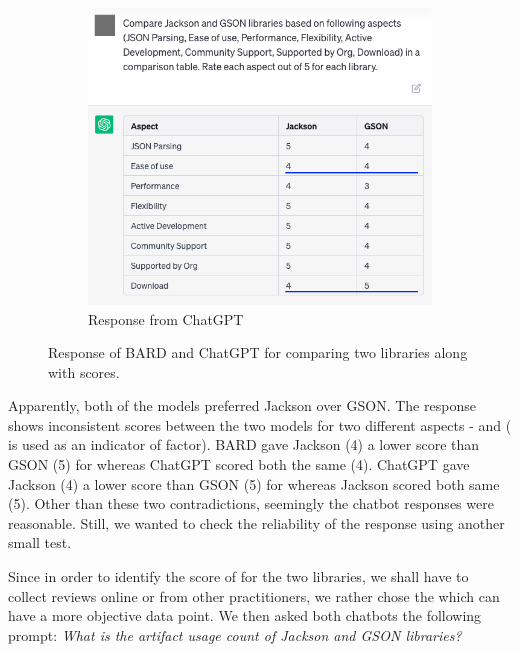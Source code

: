\begin{figure}
\begin{subfigure}{.48\textwidth}
    \label{fig:bard-table}
    \end{subfigure}
    \begin{subfigure}{.48\textwidth}
    \centering
        \includegraphics[scale=.4]{images/ChatGPT-Response.png}
        \caption{Response from ChatGPT}
    \label{fig:chatgpt-table}
    \end{subfigure}
    \caption{Response of BARD and ChatGPT for comparing two libraries along with scores.}
    \label{fig:chatbot-comparison}
\end{figure}

Apparently, both of the models preferred Jackson over GSON. The response shows inconsistent scores between the two models for two different aspects -  and  ( is used as an indicator of  factor). BARD gave Jackson (4) a lower score than GSON (5) for  whereas ChatGPT scored both the same (4). ChatGPT gave Jackson (4) a lower score than GSON (5) for  whereas Jackson scored both same (5). Other than these two contradictions, seemingly the chatbot responses were reasonable. Still, we wanted to check the reliability of the response using another small test.

Since in order to identify the score of  for the two libraries, we shall have to collect reviews online or from other practitioners, we rather chose the  which can have a more objective data point. We then asked both chatbots the following prompt: \textit{What is the artifact usage count of Jackson and GSON libraries?}

